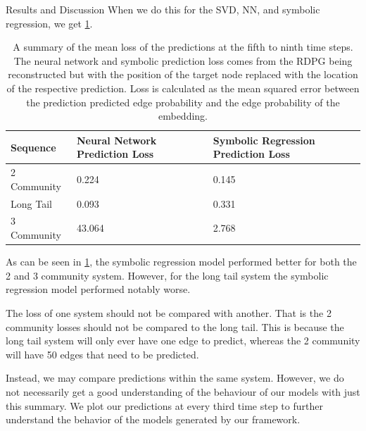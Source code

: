 \documentclass[12pt]{amsbook}
\begin{document}
\begin{chapter}{Results and Discussion}
        When we do this for the SVD, NN, and symbolic regression, we get \cref{loss_table}.
        \begin{table}
            \begin{center}
                \begin{tabular}{| m{} | m{} | m{} |}
                    \hline
                    Sequence & Neural Network Prediction Loss & Symbolic Regression Prediction Loss\\ 
                    \hline
                    \hline
                    2 Community & 0.224 & 0.145 \\ 
                    \hline 
                    Long Tail  & 0.093 & 0.331 \\ 
                    \hline 
                    3 Community & 43.064 & 2.768 \\ 
                    \hline 
                \end{tabular}
                \end{center}
                \caption{A summary of the mean loss of the predictions at the fifth to ninth time steps. The neural network and symbolic prediction loss comes from the RDPG being reconstructed but with the position of the target node replaced with the location of the respective prediction. Loss is calculated as the mean squared error between the prediction predicted edge probability and the edge probability of the embedding.}
                \label{loss_table}
        \end{table}

        As can be seen in \cref{loss_table}, the symbolic regression model performed better for both the 2 and 3 community system. However, for the long tail system the symbolic regression model performed notably worse. 

        The loss of one system should not be compared with another. That is the 2 community losses should not be compared to the long tail. This is because the long tail system will only ever have one edge to predict, whereas the 2 community will have 50 edges that need to be predicted.

        Instead, we may compare predictions within the same system. However, we do not necessarily get a good understanding of the behaviour of our models with just this summary. We plot our predictions at every third time step to further understand the behavior of the models generated by our framework.


\end{chapter}
\end{document}
